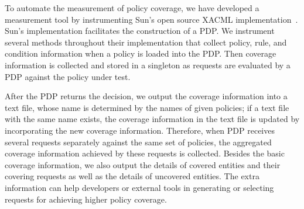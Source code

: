 To automate the measurement of policy coverage, we have developed a
measurement tool by instrumenting Sun's open source XACML
implementation~\cite{sun05:xacml}. Sun's implementation facilitates
the construction of a PDP. We instrument several methods throughout
their implementation that collect policy, rule, and condition
information when a policy is loaded into the PDP. Then coverage
information is collected and stored in a singleton as requests are
evaluated by a PDP against the policy under test.


After the PDP returns the decision, we output the coverage
information into a text file, whose name is determined by the names
of given policies; if a text file with the same name exists, the
coverage information in the text file is updated by incorporating
the new coverage information. Therefore, when PDP receives several
requests separately against the same set of policies, the aggregated
coverage information achieved by these requests is collected.
Besides the basic coverage information, we also output the details
of covered entities and their covering requests as well as the
details of uncovered entities. The extra information can help
developers or external tools in generating or selecting requests for
achieving higher policy coverage.
